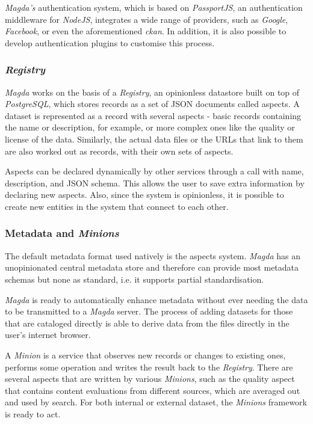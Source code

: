 \textit{Magda's} authentication system, which is based on \textit{PassportJS}, an authentication middleware for \textit{NodeJS}, integrates a wide range of providers, such as \textit{Google}, \textit{Facebook}, or even the aforementioned \textit{\gls{ckan}}. In addition, it is also possible to develop authentication plugins to customise this process.
  
\subsubsection{\textit{Registry}}
  
\textit{Magda} works on the basis of a \textit{Registry}, an opinionless datastore built on top of \textit{PostgreSQL}, which stores records as a set of JSON documents called aspects. A dataset is represented as a record with several aspects - basic records containing the name or description, for example, or more complex ones like the quality or license of the data. Similarly, the actual data files or the URLs that link to them are also worked out as records, with their own sets of aspects. 

Aspects can be declared dynamically by other services through a call with name, description, and JSON schema. This allows the user to save extra information by declaring new aspects. Also, since the system is opinionless, it is possible to create new entities in the system that connect to each other.
  
\subsubsection{Metadata and \textit{Minions}}
  
The default metadata format used natively is the aspects system. \textit{Magda} has an unopinionated central metadata store and therefore can provide most metadata schemas but none as standard, i.e. it supports partial standardisation.
  
\textit{Magda} is ready to automatically enhance metadata without ever needing the data to be transmitted to a \textit{Magda} server. The process of adding datasets for those that are cataloged directly is able to derive data from the files directly in the user's internet browser. 
  
A \textit{Minion} is a service that observes new records or changes to existing ones, performs some operation and writes the result back to the \textit{Registry}. There are several aspects that are written by various \textit{Minions}, such as the quality aspect that contains content evaluations from different sources, which are averaged out and used by search. For both internal or external dataset, the \textit{Minions} framework is ready to act.
  

